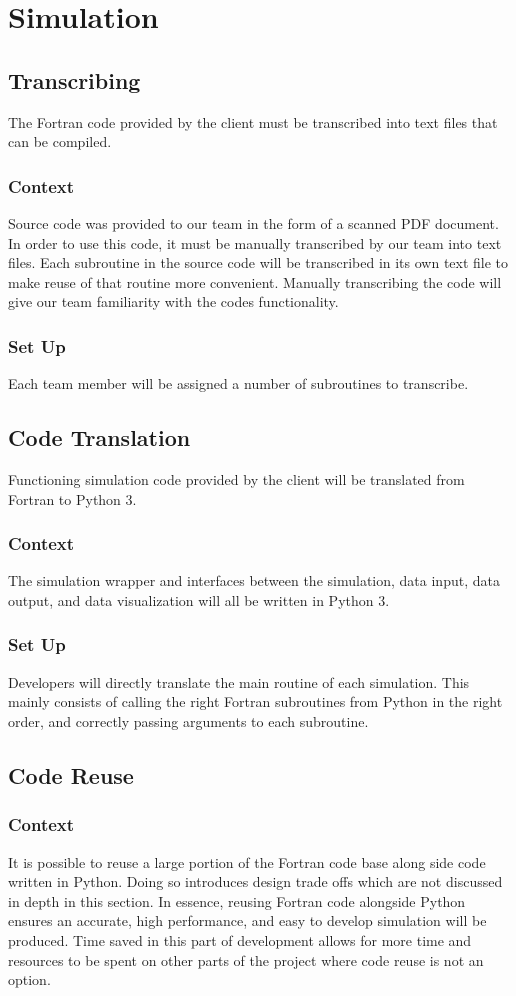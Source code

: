 \documentclass[onecolumn, draftclsnofoot,10pt, compsoc]{IEEEtran}
\begin{document}
\section{Simulation}
\subsection{Transcribing}
The Fortran code provided by the client must be transcribed into text files that can be compiled.
\subsubsection{Context}
Source code was provided to our team in the form of a scanned PDF document. In order to use this code, it must be manually transcribed by our team into text files. Each subroutine in the source code will be transcribed in its own text file to make reuse of that routine more convenient. Manually transcribing the code will give our team familiarity with the codes functionality. 
\subsubsection{Set Up}
Each team member will be assigned a number of subroutines to transcribe. 

\subsection{Code Translation}
Functioning simulation code provided by the client will be translated from Fortran to Python 3. 
\subsubsection{Context}
The simulation wrapper and interfaces between the simulation, data input, data output, and data visualization will all be written in Python 3. 
\subsubsection{Set Up}
Developers will directly translate the main routine of each simulation. This mainly consists of calling the right Fortran subroutines from Python in the right order, and correctly passing arguments to each subroutine. 


\subsection{Code Reuse}
\subsubsection{Context}
It is possible to reuse a large portion of the Fortran code base along side code written in Python. Doing so introduces design trade offs which are not discussed in depth in this section. In essence, reusing Fortran code alongside Python ensures an accurate, high performance, and easy to develop simulation will be produced. Time saved in this part of development allows for more time and resources to be spent on other parts of the project where code reuse is not an option. 
\end{document}

